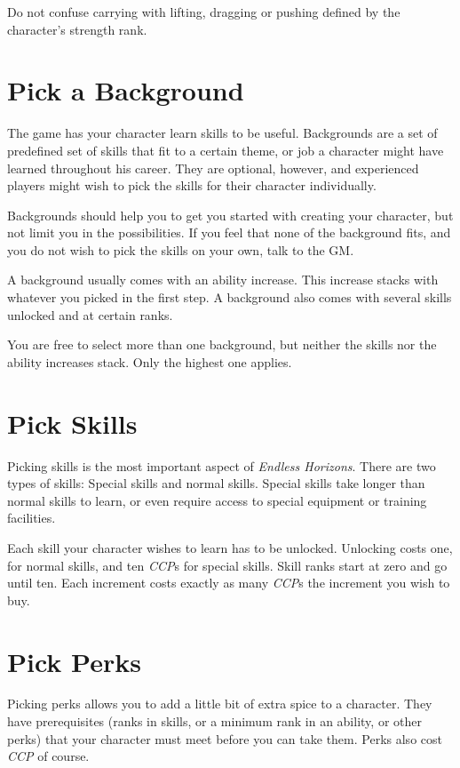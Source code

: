 Do not confuse carrying with lifting, dragging or pushing defined by
the character's strength rank.

\section{Pick a Background}
\label{sec:2-Pick a Background}

The game has your character learn skills to be useful. Backgrounds are a set of
predefined set of skills that fit to a certain theme, or job a character might
have learned throughout his career. They are optional, however, and experienced
players might wish to pick the skills for their character individually.

Backgrounds should help you to get you started with creating your character, but
not limit you in the possibilities. If you feel that none of the background fits,
and you do not wish to pick the skills on your own, talk to the GM.

A background usually comes with an ability increase. This increase stacks with
whatever you picked in the first step. A background also comes with several
skills unlocked and at certain ranks.

You are free to select more than one background, but neither the skills nor the
ability increases stack. Only the highest one applies.

\section{Pick Skills}
\label{sec:2-Pick Skills}

Picking skills is the most important aspect of \emph{Endless Horizons}. There
are two types of skills: Special skills and normal skills. Special skills take
longer than normal skills to learn, or even require access to special equipment
or training facilities.

Each skill your character wishes to learn has to be unlocked. Unlocking costs
one, for normal skills, and ten \emph{CCP}s for special skills. Skill ranks
start at zero and go until ten. Each increment costs exactly as many
\emph{CCP}s the increment you wish to buy.

\section{Pick Perks}
\label{sec:3-Pick Perks}

Picking perks allows you to add a little bit of extra spice to a character.
They have prerequisites (ranks in skills, or a minimum rank in an ability,
or other perks) that your character must meet before you can take them.
Perks also cost \emph{CCP} of course.
